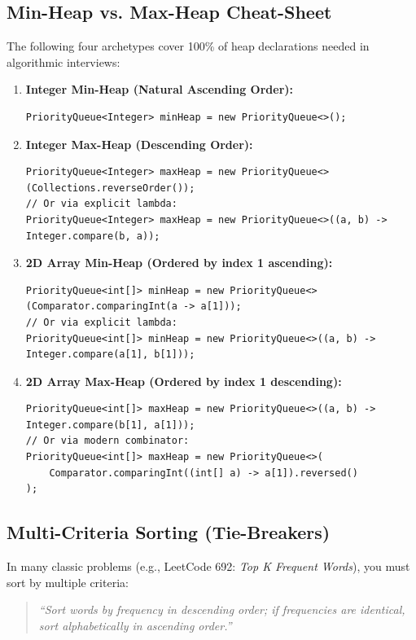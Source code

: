 \documentclass[10pt,journal,compsoc,onecolumn]{IEEEtran}
\begin{document}
\subsection{Min-Heap vs. Max-Heap Cheat-Sheet}
The following four archetypes cover 100\% of heap declarations needed in algorithmic interviews:

\begin{enumerate}
    \item \textbf{Integer Min-Heap (Natural Ascending Order):}
\begin{verbatim}
PriorityQueue<Integer> minHeap = new PriorityQueue<>();
\end{verbatim}
    \item \textbf{Integer Max-Heap (Descending Order):}
\begin{verbatim}
PriorityQueue<Integer> maxHeap = new PriorityQueue<>(Collections.reverseOrder());
// Or via explicit lambda:
PriorityQueue<Integer> maxHeap = new PriorityQueue<>((a, b) -> Integer.compare(b, a));
\end{verbatim}
    \item \textbf{2D Array Min-Heap (Ordered by index 1 ascending):}
\begin{verbatim}
PriorityQueue<int[]> minHeap = new PriorityQueue<>(Comparator.comparingInt(a -> a[1]));
// Or via explicit lambda:
PriorityQueue<int[]> minHeap = new PriorityQueue<>((a, b) -> Integer.compare(a[1], b[1]));
\end{verbatim}
    \item \textbf{2D Array Max-Heap (Ordered by index 1 descending):}
\begin{verbatim}
PriorityQueue<int[]> maxHeap = new PriorityQueue<>((a, b) -> Integer.compare(b[1], a[1]));
// Or via modern combinator:
PriorityQueue<int[]> maxHeap = new PriorityQueue<>(
    Comparator.comparingInt((int[] a) -> a[1]).reversed()
);
\end{verbatim}
\end{enumerate}

\subsection{Multi-Criteria Sorting (Tie-Breakers)}
In many classic problems (e.g., LeetCode 692: \emph{Top K Frequent Words}), you must sort by multiple criteria:
\begin{quote}
\emph{``Sort words by frequency in descending order; if frequencies are identical, sort alphabetically in ascending order.''}
\end{quote}
\end{document}
